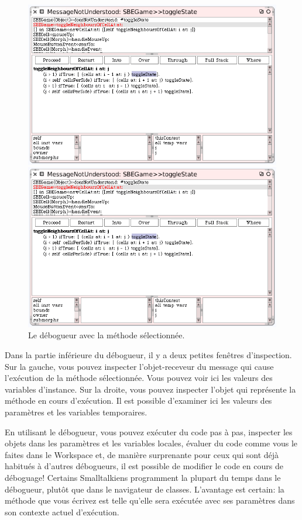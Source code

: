 \documentclass[a4paper,10pt,twoside]{book}
\begin{document}
\begin{figure}[ht]
\ifluluelse
	{\centerline {\includegraphics[width=\textwidth]{Debugger}}}
	{\centerline {\includegraphics[scale=0.7]{Debugger}}}
\caption{Le débogueur avec la méthode  sélectionnée.
\label{fig:debugToggle}}
\end{figure}

Dans la partie inférieure du débogueur, il y a deux petites fen\^etres
d'inspection. Sur la gauche, vous pouvez inspecter l'objet-receveur du message qui cause l'exécution de la méthode sélectionnée. Vous pouvez voir ici les valeurs des variables d'instance.
Sur la droite, vous pouvez inspecter l'objet qui représente la méthode en cours d'exécution. Il est possible d'examiner ici les valeurs des paramètres et les variables temporaires.

En utilisant le débogueur, vous pouvez exécuter du code pas à pas,
inspecter les objets dans les paramètres et les variables locales,
évaluer du code comme vous le faites dans le Workspace et, de manière
surprenante pour ceux qui sont déjà habitués à d'autres débogueurs, il
est possible de modifier le code en cours de déboguage! 
Certains Smalltalkiens programment la plupart du temps dans le
débogueur, plutôt que dans le navigateur de classes.
L'avantage est certain: la méthode que vous écrivez est telle
qu'elle sera exécutée \ie avec ses paramètres dans son contexte
actuel d'exécution.
\end{document}
